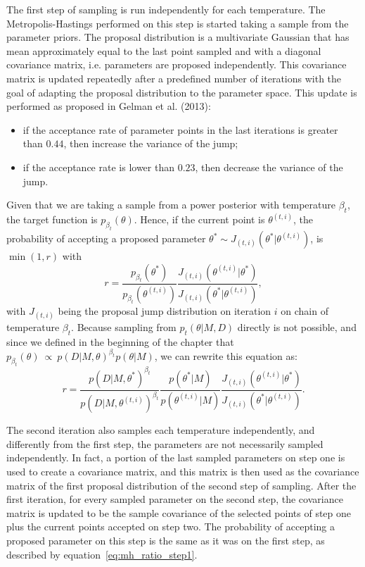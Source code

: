 The first step of sampling is run independently for each temperature. 
The Metropolis-Hastings performed on this step is started taking a 
sample from the parameter priors. The proposal distribution is 
a multivariate Gaussian that has mean approximately equal to the last 
point sampled and with a diagonal covariance matrix, i.e. parameters are 
proposed independently. This covariance matrix is updated repeatedly 
after a predefined number of iterations with the goal of adapting the 
proposal distribution to the parameter space. This update is performed 
as proposed in Gelman et al. (2013): 
\begin{itemize}
\item{if the acceptance rate of parameter points in the last 
    iterations is greater than $0.44$, then increase the variance of the
    jump;}
\item{if the acceptance rate is lower than $0.23$, then decrease the 
    variance of the jump.}
\end{itemize}
Given that we are taking a sample from a power posterior with 
temperature $\beta_t$, the target function is 
$p_{\beta_t} (\theta)$. Hence, if the current point 
is $\theta^{(t, i)}$, the probability of accepting a proposed parameter 
$\theta^* \sim J_{(t, i)} (\theta^* | \theta^{(t, i)})$, is 
$\min (1, r)$ with
\begin{equation*}
    r = \frac{p_{\beta_t} (\theta^*)}
             {p_{\beta_t} (\theta^{(t, i)})}
        \frac{J_{(t, i)} (\theta^{(t, i)} | \theta^*)}
             {J_{(t, i)} (\theta^* | \theta^{(t, i)})},
\end{equation*}
with $J_{(t, i)}$ being the proposal jump distribution on iteration $i$ 
on chain of temperature $\beta_t$. Because sampling from $p_t(\theta | 
M, D)$ directly is not possible, and  since we defined in the beginning 
of the chapter that 
$p_{\beta_t} (\theta)~\propto~p (D|M, \theta)^{\beta_t} p (\theta | M)$,
we can rewrite this equation as:
\begin{equation}
    r = \frac{p (D | M, \theta^*)^{\beta_t}}
             {p (D | M, \theta^{(t, i)})^{\beta_t}}
        \frac{p (\theta^* | M)}
             {p (\theta^{(t, i)} | M)}
        \frac{J_{(t, i)} (\theta^{(t, i)} | \theta^*)}
             {J_{(t, i)} (\theta^* | \theta^{(t, i)})}.
    \label{eq:mh_ratio_step1}
\end{equation}

The second iteration also samples each temperature independently, and
differently from the first step, the parameters are not necessarily 
sampled independently. In fact, a portion of the last sampled parameters
on step one is used to create a covariance matrix, and this matrix is
then used as the covariance matrix of the first proposal distribution of 
the second step of sampling. After the first iteration, for every 
sampled parameter on the second step, the covariance matrix is updated 
to be the sample covariance of the selected points of step one plus the  
current points accepted on step two. The probability of accepting a 
proposed parameter on this step is the same  as it was on the first 
step, as described by equation~\ref{eq:mh_ratio_step1}.

